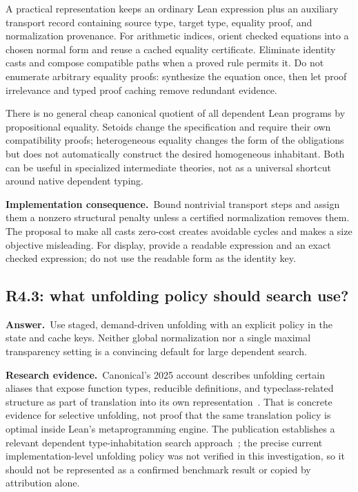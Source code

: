 \documentclass[11pt,a4paper]{article}
\theoremstyle{definition}
\theoremstyle{remark}
\newcommand{\code}[1]{\texttt{\detokenize{#1}}}
\newcommand{\ans}{\noindent\textbf{Answer.}\ }
\newcommand{\imp}{\par\noindent\textbf{Implementation consequence.}\ }
\newcommand{\lit}{\par\noindent\textbf{Research evidence.}\ }
\begin{document}
A practical representation keeps an ordinary Lean expression plus an auxiliary
transport record containing source type, target type, equality proof, and
normalization provenance. For arithmetic indices, orient checked equations
into a chosen normal form and reuse a cached equality certificate. Eliminate
identity casts and compose compatible paths when a proved rule permits it.
Do not enumerate arbitrary equality proofs: synthesize the equation once,
then let proof irrelevance and typed proof caching remove redundant evidence.

There is no general cheap canonical quotient of all dependent Lean programs
by propositional equality. Setoids change the specification and require their
own compatibility proofs; heterogeneous equality changes the form of the
obligations but does not automatically construct the desired homogeneous
inhabitant. Both can be useful in specialized intermediate theories, not as a
universal shortcut around native dependent typing.

\imp Bound nontrivial transport steps and assign them a nonzero structural
penalty unless a certified normalization removes them. The proposal to make
all casts zero-cost creates avoidable cycles and makes a size objective
misleading. For display, provide a readable expression and an exact checked
expression; do not use the readable form as the identity key.

\subsection{R4.3: what unfolding policy should search use?}\label{q:R4.3}
\ans Use staged, demand-driven unfolding with an explicit policy in the state
and cache keys. Neither global normalization nor a single maximal transparency
setting is a convincing default for large dependent search.

\lit Canonical's 2025 account describes unfolding certain aliases that expose
function types, reducible definitions, and typeclass-related structure as part
of translation into its own representation~\cite{canonical}. That is concrete
evidence for selective unfolding, not proof that the same translation policy
is optimal inside Lean's metaprogramming engine. The \code{sauto} publication
establishes a relevant dependent type-inhabitation search approach~\cite{sauto};
the precise current implementation-level unfolding policy was not verified in
this investigation, so it should not be represented as a confirmed benchmark
result or copied by attribution alone.
\end{document}
